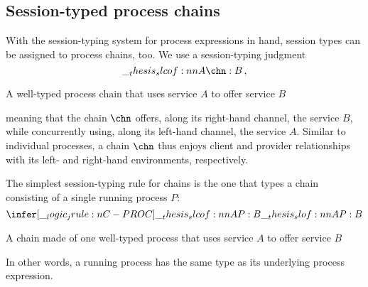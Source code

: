 \subsection{Session-typed process chains}

With the session-typing system for process expressions in hand, session types can be assigned to process chains, too.
We use a session-typing judgment
\begin{equation*}
  \slcof{A |- \chn : B} \,,
\end{equation*}
%
\begin{marginfigure}[-4\baselineskip]
  \centering
  \caption{A well-typed process chain that uses service $A$ to offer service $B$}\label{fig:singleton-processes:well-typed-chain}
\end{marginfigure}%
%
meaning that the chain $\chn$ offers, along its right-hand channel, the service $B$, while concurrently using, along its left-hand channel, the service $A$.
Similar to individual processes, a chain $\chn$ thus enjoys client and provider relationships with its left- and right-hand environments, respectively.

The simplest session-typing rule for chains is the one that types a chain consisting of a single running process $P$:
\begin{equation*}
  \infer[\jrule{C-PROC}]{\slcof{A |- P : B}}{
    \slof{A |- P : B}}
\end{equation*}
%
\begin{marginfigure}[-3\baselineskip]
  \centering
  \caption{A chain made of one well-typed process that uses service $A$ to offer service $B$}\label{fig:singleton-processes:single-process-chain}
\end{marginfigure}%
%
In other words, a running process has the same type as its underlying process expression.


